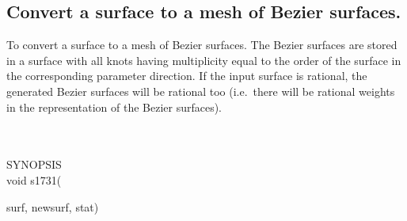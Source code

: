 \subsection{Convert a surface to a mesh of Bezier surfaces.}
\begin{minipg1}
  To convert a surface to a mesh of Bezier surfaces.
  The Bezier surfaces are stored in a surface with all knots having
  multiplicity equal to the order of the surface in the
  corresponding parameter direction.
  If the input surface is rational, the generated Bezier surfaces will be
  rational too (i.e.\ there will be rational weights in the
  representation of the Bezier surfaces).
\end{minipg1} \\ \\
SYNOPSIS\\
        \>void s1731(\begin{minipg3}
                                {\fov surf}, {\fov newsurf}, {\fov stat})
                \end{minipg3}\\[0.3ex]

